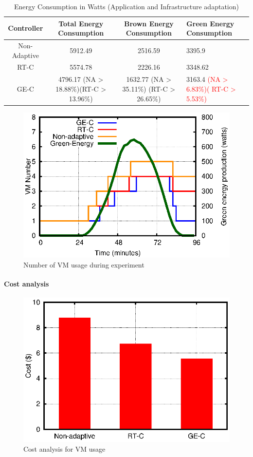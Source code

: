 \begin{table}
\caption{Energy Consumption in Watts (Application and Infrastructure adaptation)}
  \label{tab:watt2}
\begin{tabular}{cccl}
\toprule
Controller & Total Energy Consumption & Brown Energy Consumption & Green Energy Consumption\\
\midrule
Non-Adaptive & 5912.49 & 2516.59 & 3395.9 \\
RT-C & 5574.78 & 2226.16 & 3348.62  \\  %
GE-C & 4796.17 (NA > 18.88\%)(RT-C > 13.96\%) & 1632.77 (NA > 35.11\%) (RT-C > 26.65\%) & 3163.4 \textcolor{red}{(NA > 6.83\%)( RT-C > 5.53\%)} \\
\bottomrule
\end{tabular}
\end{table}

\begin{figure} [htb]
\centering
\includegraphics[scale=.8]{Graphs/vm.eps}
\caption{Number of VM usage during experiment}
\label{fig:vm}
\end{figure}



\paragraph{\textbf{Cost analysis}}

\begin{figure} [htb]
\centering
\includegraphics[scale=.7]{Graphs/cost.eps}
\caption{Cost analysis for VM usage}
\label{fig:cost}
\end{figure}
